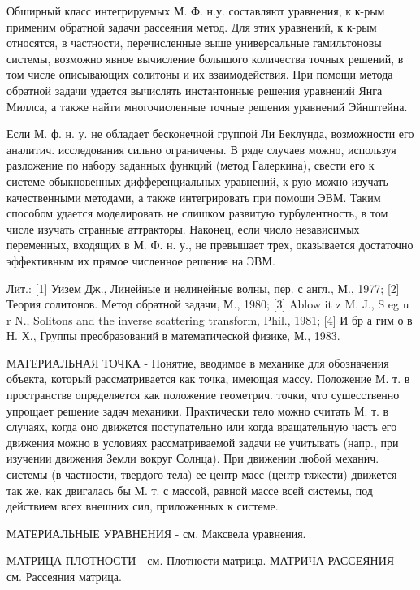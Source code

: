 \documentclass[10pt]{article}
\begin{document}
Обширный класс интегрируемых М. Ф. н.у. составляют уравнения, к к-рым применим обратной задачи рассеяния метод. Для этих уравнений, к к-рым относятся, в частности, перечисленные выше универсальные гамильтоновы системы, возможно явное вычисление болышого количества точных решений, в том числе описывающих солитоны и их взаимодействия. При помощи метода обратной задачи удается вычислять инстантонные решения уравнений Янга Миллса, а также найти многочисленные точные решения уравнений Эйнштейна.



Если М. ф. н. у. не обладает бесконечной группой Ли Беклунда, возможности его аналитич. исследования сильно ограничены. В ряде случаев можно, используя разложение по набору заданных функций (метод Галеркина), свести его к системе обыкновенных дифференциальных уравнений, к-рую можно изучать качественными методами, а также интегрировать при помоши ЭВМ. Таким способом удается моделировать не слишком развитую турбулентность, в том числе изучать странные аттракторы. Наконец, если число независимых переменных, входящих в М. Ф. н. у., не превышает трех, оказывается достаточно эффективным их прямое численное решение на ЭВМ.



Лит.: [1] Уизем Дж., Линейные и нелинейные волны, пер. с англ., М., 1977; [2] Теория солитонов. Метод обратной задачи, М., 1980; [3] Ablow it z M. J., S eg u r N., Solitons and the inverse scattering transform, Phil., 1981; [4] И бр а гим о в Н. Х., Группы преобразований в математической физике, М., 1983.



МАТЕРИАЛЬНАЯ ТОЧКА - Понятие, вводимое в механике для обозначения объекта, который рассматривается как точка, имеющая массу. Положение М. т. в пространстве определяется как положение геометрич. точки, что сушесственно упрощает решение задач механики. Практически тело можно считать М. т. в случаях, когда оно движется поступательно или когда вращательную часть его движения можно в условиях рассматриваемой задачи не учитывать (напр., при изучении движения Земли вокруг Солнца). При движении любой механич. системы (в частности, твердого тела) ее центр масс (центр тяжести) движется так же, как двигалась бы М. т. с массой, равной массе всей системы, под действием всех внешних сил, приложенных к системе.



МАТЕРИАЛЬНЫЕ УРАВНЕНИЯ - см. Максвела уравнения.



МАТРИЦА ПЛОТНОСТИ - см. Плотности матрица. МАТРИЧА РАССЕЯНИЯ - см. Рассеяния матрица.
\end{document}
